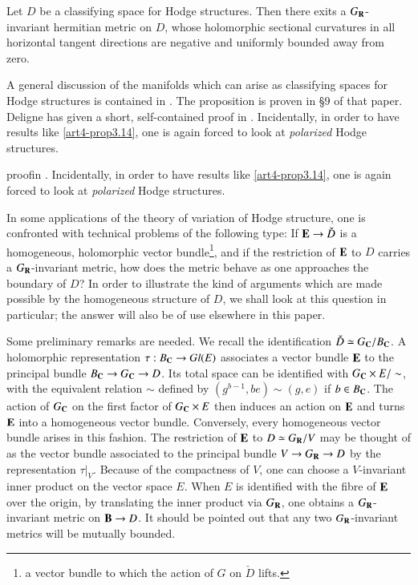 \setcounter{proposition}{13}
\begin{proposition}\label{art4-prop3.14}
Let $D$ be a classifying space for Hodge structures. Then there exits a $G_{\mathbf{R}}$-invariant hermitian metric on $D$, whose holomorphic sectional curvatures in all horizontal tangent directions are negative and uniformly bounded away from zero.
\end{proposition}

A general discussion of the manifolds which can arise as classifying spaces for Hodge structures is contained in \cite{art4-key25}. The proposition is proven in \S 9 of that paper. Deligne has given a short, self-contained proof in \cite{art4-key11}. Incidentally, in order to have results like \eqref{art4-prop3.14}, one is again forced to look at \textit{polarized} Hodge structures. 

proof\pageoriginale in \cite{key11}. Incidentally, in order to have results like \eqref{art4-prop3.14}, one is again forced to look at \textit{polarized} Hodge structures.

In some applications of the theory of variation of Hodge structure, one is confronted with technical problems of the following type: If $\mathbf{E} \to \check{D}$ is a homogeneous, holomorphic vector bundle\footnote[10]{\ie a vector bundle to which the action of $G$ on $\check{D}$ lifts.}, and if the restriction of $\mathbf{E}$ to $D$ carries a $G_{\mathbf{R}}$-invariant metric, how does the metric behave as one approaches the boundary of $D$? In order to illustrate the kind of arguments which are made possible by the homogeneous  structure of $D$, we shall look at this question in particular; the answer will also be of use elsewhere in this paper.

Some preliminary remarks are needed. We recall the identification $\check{D} \simeq G_{\mathbf{C}} / B_{\mathbf{C}}$. A holomorphic representation $\tau: B_{\mathbf{C}} \to Gl (E)$ associates a vector bundle $\mathbf{E}$ to the principal bundle $B_{\mathbf{C}} \to G_{\mathbf{C}} \to D$. Its total space can be identified with $G_{\mathbf{C}} \times E/ \sim$, with the equivalent relation $\sim$ defined by $(g^{b-1}, be) \sim (g,e)$ if $b \in B_{\mathbf{C}}$. The action of $G_{\mathbf{C}}$ on the first factor of $G_{\mathbf{C}} \times E$ then induces an action on $\mathbf{E}$ and turns $\mathbf{E}$ into a homogeneous vector bundle. Conversely, every homogeneous vector bundle arises in this fashion. The restriction of $\mathbf{E}$ to $D \simeq G_{\mathbf{R}} / V$ may be thought of as the vector bundle associated to the principal bundle $V \to G_{\mathbf{R}} \to D$ by the representation $\tau|_V$. Because of the compactness of $V$, one can choose a $V$-invariant inner product on the vector space $E$. When $E$ is identified with the fibre of $\mathbf{E}$ over the origin, by translating the inner product via $G_{\mathbf{R}}$, one obtains a $G_{\mathbf{R}}$-invariant metric on $\mathbf{B} \to D$. It should be pointed out that any two $G_{\mathbf{R}}$-invariant metrics will be mutually bounded.

